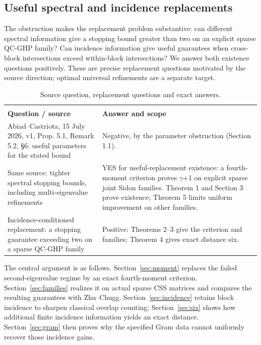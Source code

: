 \documentclass[11pt]{article}
\begin{document}
\subsection{Useful spectral and incidence replacements}
The obstruction makes the replacement problem substantive: can different
spectral information give a stopping bound greater than two on an explicit
sparse QC-GHP family? Can incidence information give useful guarantees when
cross-block intersections exceed within-block intersections? We answer both
existence questions positively. These are precise replacement questions motivated
by the source direction; optimal universal refinements are a separate target.
\begin{longtable}{@{}>{\raggedright\arraybackslash}p{.465\linewidth}>{\raggedright\arraybackslash}p{.465\linewidth}@{}}
\toprule
\caption{Source question, replacement questions and exact answers.}\label{tab:answers}\\
\textbf{Question / source} & \textbf{Answer and scope}\\\midrule\endhead
Abiad--Castriota, 15 July 2026, v1, Prop. 5.1, Remark 5.2, §6: useful parameters for the stated bound & Negative, by the parameter obstruction (Section 1.1).\\[4pt]
Same source: tighter spectral stopping bounds, including multi-eigenvalue refinements & YES for useful-replacement existence: a fourth-moment criterion proves \ensuremath{\gamma}+1 on explicit sparse joint Sidon families. Theorem 1 and Section 3 prove existence; Theorem 5 limits uniform improvement on other families.\\[4pt]
Incidence-conditioned replacement: a stopping guarantee exceeding two on a sparse QC-GHP family & Positive: Theorems 2--3 give the criterion and families; Theorem 4 gives exact distance six.\\[4pt]
\bottomrule\end{longtable}
The central argument is as follows. Section~\ref{sec:moment} replaces the failed
second-eigenvalue regime by an exact fourth-moment criterion. Section~\ref{sec:families}
realizes it on actual sparse CSS matrices and compares the resulting guarantees
with Zhu--Chugg. Section~\ref{sec:incidence} retains block incidence to sharpen
classical overlap counting; Section~\ref{sec:six} shows how additional finite
incidence information yields an exact distance. Section~\ref{sec:gram} then proves
why the specified Gram data cannot uniformly recover those incidence gains.
\end{document}
